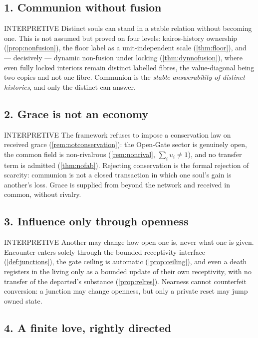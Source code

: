 \documentclass[11pt,a4paper]{article}
\newcommand{\stInterp}{\textcolor{cInt}{\textsf{\small INTERPRETIVE}}}
\theoremstyle{definition}
\theoremstyle{plain}
\theoremstyle{remark}
\begin{document}
\subsection*{1. Communion without fusion}

\stInterp\quad
Distinct souls can stand in a stable relation without becoming one. This is not assumed but
proved on four levels: kairos-history ownership (\ref{prop:nonfusion}), the floor label as a
unit-independent scale (\ref{thm:floor}), and --- decisively --- dynamic non-fusion under
locking (\ref{thm:dynnofusion}), where even fully locked interiors remain distinct labelled
fibres, the value-diagonal being two copies and not one fibre. Communion is the
\emph{stable answerability of distinct histories}, and only the distinct can answer.

\subsection*{2. Grace is not an economy}

\stInterp\quad
The framework refuses to impose a conservation law on received grace
(\ref{rem:notconservation}): the Open-Gate sector is genuinely open, the common field is
non-rivalrous (\ref{rem:nonrival}, \(\sum_i\upsilon_i\neq1\)), and no transfer term is
admitted (\ref{thm:nofab}). Rejecting conservation is the formal rejection of scarcity:
communion is not a closed transaction in which one soul's gain is another's loss. Grace is
supplied from beyond the network and received in common, without rivalry.

\subsection*{3. Influence only through openness}

\stInterp\quad
Another may change how open one is, never what one is given. Encounter enters solely through
the bounded receptivity interface (\ref{def:junctions}), the gate ceiling is automatic
(\ref{prop:ceiling}), and even a death registers in the living only as a bounded update of
their own receptivity, with no transfer of the departed's substance (\ref{prop:relres}).
Nearness cannot counterfeit conversion: a junction may change openness, but only a private
reset may jump owned state.

\subsection*{4. A finite love, rightly directed}
\end{document}
